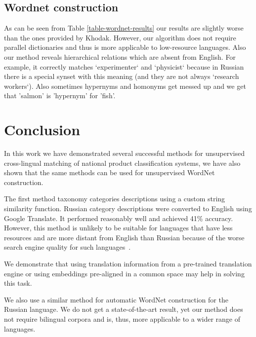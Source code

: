 \documentclass[11pt,a4paper]{article}
\begin{document}
\subsection{Wordnet construction}




As can be seen from Table \ref{table-wordnet-results} our results are slightly worse than the ones provided by Khodak. However, our algorithm does not require parallel dictionaries and thus is more applicable to low-resource languages.
Also our method reveals hierarchical relations which are absent from English. For example, it correctly matches `experimenter` and `physicist` because in Russian there is a special synset with this meaning (and they are not always `research workers`). Also sometimes hypernyms and homonyms get messed up and we get that 'salmon' is 'hypernym' for 'fish'.


%
%


\section{Conclusion}
In this work we have demonstrated several successful methods for unsupervised cross-lingual matching of national product classification systems, we have also shown that the same methods can be used for unsupervised WordNet construction.

The first method taxonomy categories descriptions using a custom string similarity function. Russian category descriptions were converted to English using Google Translate. It performed reasonably well and achieved 41\% accuracy. However, this method is unlikely to be suitable for languages that have less resources and are more distant from English than Russian because of the worse search engine quality for such languages~\cite{google-translate-rare}.


We demonstrate that using translation information from a pre-trained translation engine or using embeddings pre-aligned in a common space may help in solving this task.

We also use a similar method for automatic WordNet construction for the Russian language. We do not get a state-of-the-art result, yet our method does not require bilingual corpora and is, thus, more applicable to a wider range of languages.




\end{document}
